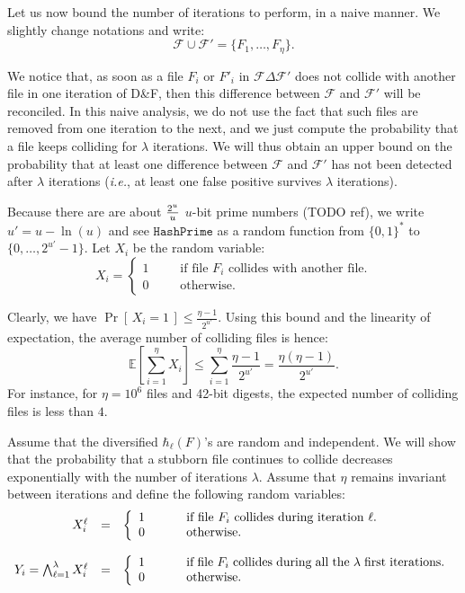 \documentclass[11pt]{llncs}
\newcommand{\Prob}[1]{{\Pr\left[\,{#1}\,\right]}}
\newcommand{\EE}[1]{{\mathbb{E}\left[{#1}\right]}}
\newcommand{\Files}{\mathcal{F}}
\newcommand{\df}{D\&F\xspace}
\newcommand{\ie}{\textit{i.e.}\xspace}
\newcommand{\HashPrime}{\ensuremath{\mathtt{HashPrime}}}
\begin{document}
Let us now bound the number of iterations to perform, in a naive manner.
We slightly change notations and write:
\[ \Files \cup \Files' = \{ F_1, \dots, F_\eta \}. \]

We notice that, as soon as a file $F_i$ or $F'_i$ in $\Files \Delta \Files'$ does not collide with another file in one iteration of \df, then this difference between $\Files$ and $\Files'$ will be reconciled.
In this naive analysis, we do not use the fact that such files are removed from one iteration to the next, and we just compute the probability that a file keeps colliding for $\lambda$ iterations. We will thus obtain an upper bound on the probability that at least one difference between $\Files$ and $\Files'$ has not been detected after $\lambda$ iterations (\ie, at least one false positive survives $\lambda$ iterations).

Because there are are about $2^u \over u$ $u$-bit prime numbers (TODO ref), we write $u' = u - \ln(u)$ and see $\HashPrime$ as a random function from $\{0,1\}^*$ to $\{0,\dots,2^{u'}-1\}$. Let $X_i$ be the random variable:
\[
X_i =
\left\{
\begin{array}{lcl}
1 & ~~~~&  \mbox{if file $F_i$ collides with another file.}\\
0 & ~~~~&  \mbox{otherwise.}
\end{array}
\right.
\]

Clearly, we have $\Prob{X_i = 1} \le \frac{\eta -1}{2^{u'}}$.
Using this bound and the linearity of expectation, the average number of colliding files is hence:
\[ \EE{\sum_{i=1}^{\eta} X_i} \le \sum_{i=1}^{\eta} \frac{\eta -1}{2^{u'}} = \frac{\eta (\eta - 1)}{2^{u'}}. \]
For instance, for $\eta=10^6$ files and 42-bit digests, the expected number of colliding files is less than $4$.

Assume that the diversified $\hbar_\ell(F)$'s are random and independent. 
We will show that the probability that a stubborn file continues to collide decreases exponentially with the number of iterations $\lambda$. Assume that $\eta$ remains invariant between iterations and define the following random variables:
\[
\begin{array}{rcl}
X^{\ell}_i & = &
\left\{
\begin{array}{lcl}
1 & ~~~~&  \parbox[t]{.6\textwidth}{if file $F_i$ collides during iteration $\ell$.}\\
0 & ~~~~&  \mbox{otherwise.}
\end{array}
\right.\\
\\
Y_i = \bigwedge_{\ell=1}^\lambda X^{\ell}_i & = &
\left\{
\begin{array}{lcl}
1 & ~~~~&  \parbox[t]{.6\textwidth}{if file $F_i$ collides during all the $\lambda$ first iterations.}\\
0 & ~~~~&  \mbox{otherwise.}
\end{array}
\right.
\end{array}\]
\end{document}

